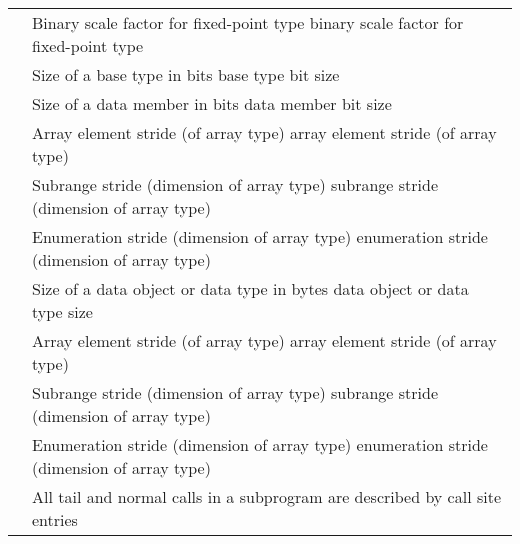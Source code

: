 \begin{longtable}{P{6.2cm}|P{8.5cm}}
\DWATbinaryscaleTARG{} 
&
        {Binary scale factor for fixed-point type}
        {binary scale factor for fixed-point type} \\
\DWATbitsizeTARG{} 
&
        {Size of a base type in bits}
        {base type bit size} \\
&
        {Size of a data member in bits}
        {data member bit size} \\
\DWATbitstrideTARG{} 
&
           {Array element stride (of array type)}
           {array element stride (of array type)} \\*
&
           {Subrange stride (dimension of array type)}
           {subrange stride (dimension of array type)} \\*
&
           {Enumeration stride (dimension of array type)}
           {enumeration stride (dimension of array type)} \\
\DWATbytesizeTARG{} 
&
           {Size of a data object or data type in bytes}
           {data object or data type size} \\
\DWATbytestrideTARG{} 
&
           {Array element stride (of array type)}
           {array element stride (of array type)} \\
&
           {Subrange stride (dimension of array type)}
           {subrange stride (dimension of array type)} \\
&
           {Enumeration stride (dimension of array type)}
           {enumeration stride (dimension of array type)} \\
\DWATcallallcallsTARG{}
&
           {All tail and normal calls in a subprogram are described by call site entries}

\end{longtable}
